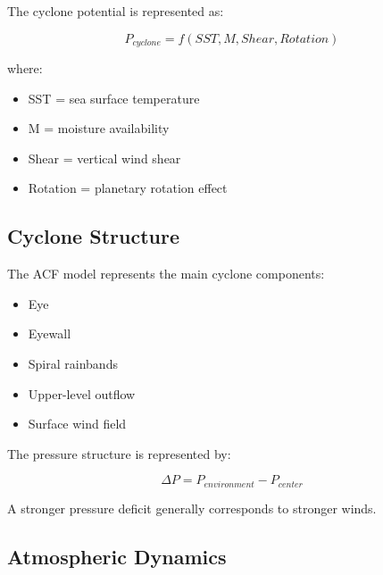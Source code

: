 The cyclone potential is represented as:

\[
P_{cyclone}
=
f(SST,M,Shear,Rotation)
\]


where:

\begin{itemize}

\item SST = sea surface temperature

\item M = moisture availability

\item Shear = vertical wind shear

\item Rotation = planetary rotation effect

\end{itemize}



\subsection{Cyclone Structure}

The ACF model represents the main cyclone components:

\begin{itemize}

\item Eye

\item Eyewall

\item Spiral rainbands

\item Upper-level outflow

\item Surface wind field

\end{itemize}


The pressure structure is represented by:

\[
\Delta P
=
P_{environment}
-
P_{center}
\]


A stronger pressure deficit generally corresponds to stronger winds.



\subsection{Atmospheric Dynamics}

